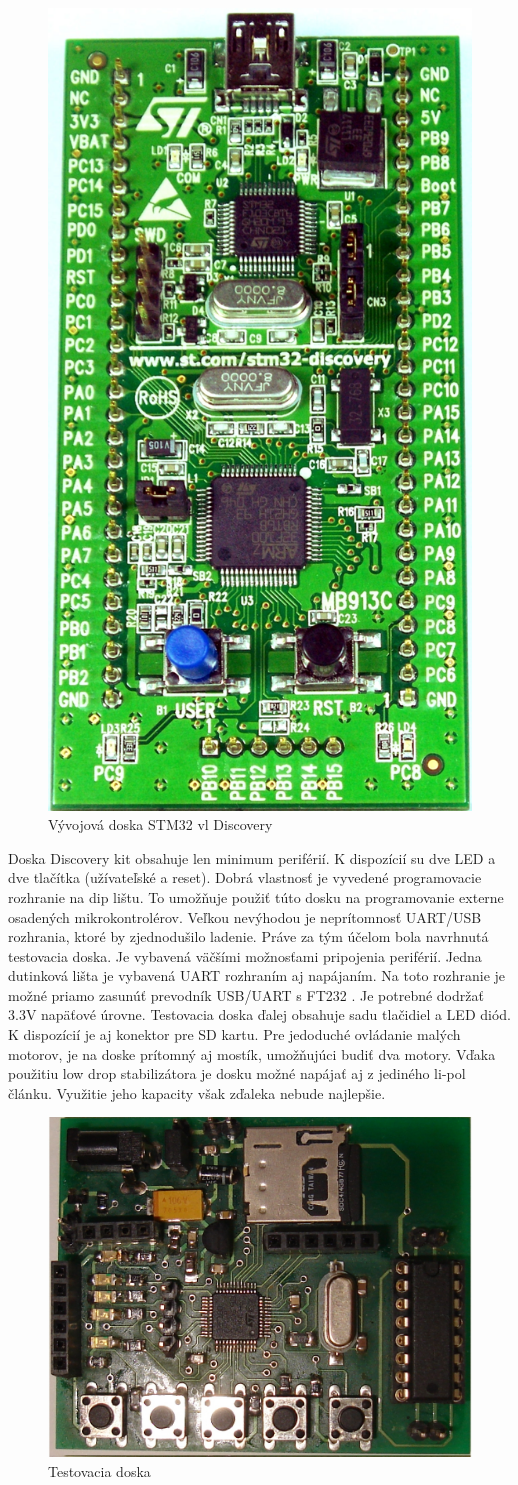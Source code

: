 \begin{figure}[ht]
\begin{center}
\begin{minipage}{1.1\linewidth}
\begin{center}
\includegraphics[width=.25\textwidth]{images/stm32_discovery_board.jpg}
\caption{Vývojová doska STM32 vl Discovery}
\label{obr2}
\end{center}
\end{minipage}
\end{center}
\end{figure}

Doska Discovery kit obsahuje len minimum periférií. K dispozícií su dve LED a dve tlačítka (užívateľské a reset). Dobrá vlastnosť je vyvedené programovacie rozhranie na dip lištu. To umožňuje použiť túto dosku na programovanie externe osadených mikrokontrolérov. Veľkou nevýhodou je neprítomnosť UART/USB rozhrania, ktoré by zjednodušilo ladenie. Práve za tým účelom bola navrhnutá testovacia doska. Je vybavená väčšími možnosťami pripojenia periférií. Jedna dutinková lišta je vybavená UART rozhraním aj napájaním. Na toto rozhranie je možné priamo zasunúť prevodník USB/UART s FT232 \cite{usb_uart}. Je potrebné dodržať 3.3V napäťové úrovne. Testovacia doska ďalej obsahuje sadu tlačidiel a LED diód. K dispozícií je aj konektor pre SD kartu. Pre jedoduché ovládanie malých motorov, je na doske prítomný aj mostík, umožňujúci budiť dva motory. Vďaka použitiu low drop stabilizátora je dosku možné napájať aj z jediného li-pol článku. Využitie jeho kapacity však zďaleka nebude najlepšie.

\begin{figure}[ht]
\begin{center}
\begin{minipage}{1.1\linewidth}
\begin{center}
\includegraphics[width=.35\textwidth]{images/test_board.jpg}
\caption{Testovacia doska}
\label{obr2}
\end{center}
\end{minipage}
\end{center}
\end{figure}

